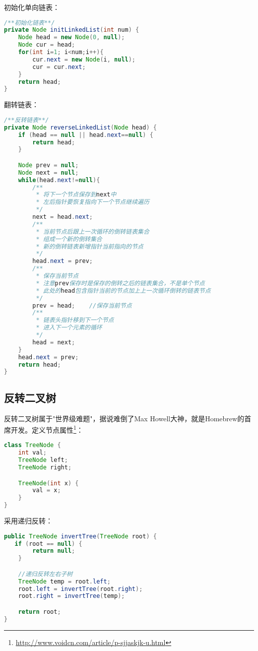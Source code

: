 \documentclass[../../../interview-questions.tex]{subfiles}
\begin{document}
初始化单向链表：

\begin{lstlisting}[language=Java]
/**初始化链表**/
private Node initLinkedList(int num) {
    Node head = new Node(0, null);
    Node cur = head;
    for(int i=1; i<num;i++){
        cur.next = new Node(i, null);
        cur = cur.next;
    }
    return head;
}
\end{lstlisting}

翻转链表：

\begin{lstlisting}[language=Java]
/**反转链表**/
private Node reverseLinkedList(Node head) {
    if (head == null || head.next==null) {
        return head;
    }

    Node prev = null;
    Node next = null;
    while(head.next!=null){
        /**
         * 将下一个节点保存到next中
         * 左后指针要恢复指向下一个节点继续遍历
         */
        next = head.next;
        /**
         * 当前节点后跟上一次循环的倒转链表集合
         * 组成一个新的倒转集合
         * 新的倒转链表新增指针当前指向的节点
         */
        head.next = prev;
        /**
         * 保存当前节点
         * 注意prev保存时是保存的倒转之后的链表集合，不是单个节点
         * 此处的head包含指针当前的节点加上上一次循环倒转的链表节点
         */
        prev = head;    //保存当前节点
        /**
         * 链表头指针移到下一个节点
         * 进入下一个元素的循环
         */
        head = next;
    }
    head.next = prev;
    return head;
}
\end{lstlisting}

\subsection{反转二叉树}

反转二叉树属于"世界级难题"，据说难倒了Max Howell大神，就是Homebrew的首席开发。定义节点属性\footnote{\url{http://www.voidcn.com/article/p-sjjaskjk-u.html}}：

\begin{lstlisting}[language=Java]
class TreeNode {
    int val;
    TreeNode left;
    TreeNode right;

    TreeNode(int x) {
        val = x;
    }
}
\end{lstlisting}

采用递归反转：

\begin{lstlisting}[language=Java]
public TreeNode invertTree(TreeNode root) {
   if (root == null) {
        return null;
    }

    //递归反转左右子树
    TreeNode temp = root.left;
    root.left = invertTree(root.right);
    root.right = invertTree(temp);

    return root; 
}
\end{lstlisting}
\end{document}
